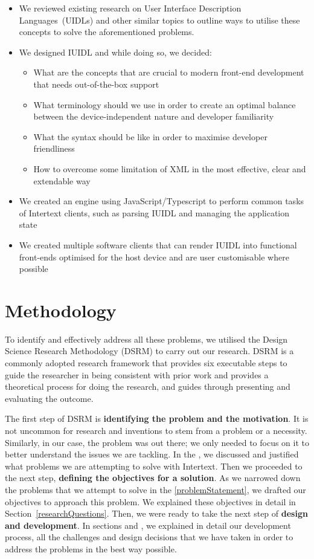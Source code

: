 \begin{itemize}
  \item We reviewed existing research on User Interface Description Languages~(UIDLs) and other similar topics to outline ways to utilise these concepts to solve the aforementioned problems.
  \item We designed IUIDL and while doing so, we decided:
  \begin{itemize}
    \item What are the concepts that are crucial to modern front-end development that needs out-of-the-box support
    \item What terminology should we use in order to create an optimal balance between the device-independent nature and developer familiarity
    \item What the syntax should be like in order to maximise developer friendliness
    \item How to overcome some limitation of XML in the most effective, clear and extendable way
  \end{itemize}
  \item We created an engine using JavaScript/Typescript to perform common tasks of Intertext clients, such as parsing IUIDL and managing the application state
  \item We created multiple software clients that can render IUIDL into functional front-ends optimised for the host device and are user customisable where possible
\end{itemize}


\section{Methodology} \label{methodology}

To identify and effectively address all these problems, we utilised the Design Science Research Methodology (DSRM) \cite{DSRM} to carry out our research. DSRM is a commonly adopted research framework that provides six executable steps to guide the researcher in being consistent with prior work and provides a theoretical process for doing the research, and guides through presenting and evaluating the outcome. 

The first step of DSRM is \textbf{identifying the problem and the motivation}. It is not uncommon for research and inventions to stem from a problem or a necessity. Similarly, in our case, the problem was out there; we only needed to focus on it to better understand the issues we are tackling. In the , we discussed and justified what problems we are attempting to solve with Intertext. Then we proceeded to the next step, \textbf{defining the objectives for a solution}. As we narrowed down the problems that we attempt to solve in the \ref{problemStatement}, we drafted our objectives to approach this problem. We explained these objectives in detail in Section~\ref{researchQuestions}. Then, we were ready to take the next step of \textbf{design and development}. In sections  and , we explained in detail our development process, all the challenges and design decisions that we have taken in order to address the problems in the best way possible. 

